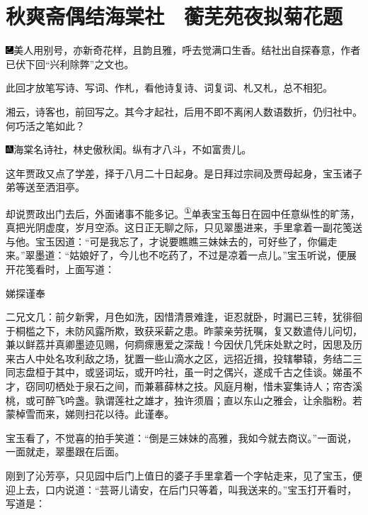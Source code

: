 

\chapter{秋爽斋偶结海棠社　蘅芜苑夜拟菊花题}

{\includegraphics[width=3mm]{../Images/00003}美人用别号，亦新奇花样，且韵且雅，呼去觉满口生香。结社出自探春意，作者已伏下回``兴利除弊''之文也。}

{此回才放笔写诗、写词、作札，看他诗复诗、词复词、札又札，总不相犯。}

{湘云，诗客也，前回写之。其今才起社，后用不即不离闲人数语数折，仍归社中。何巧活之笔如此？}

{\includegraphics[width=3mm]{../Images/00005}海棠名诗社，林史傲秋闺。纵有才八斗，不如富贵儿。}

这年贾政又点了学差，择于八月二十日起身。是日拜过宗祠及贾母起身，宝玉诸子弟等送至洒泪亭。

却说贾政出门去后，外面诸事不能多记。\href{../Text/part0041_split_000.html\#lnkback_1_a}{\textsuperscript{①}}单表宝玉每日在园中任意纵性的旷荡，真把光阴虚度，岁月空添。这日正无聊之际，只见翠墨进来，手里拿着一副花笺送与他。宝玉因道：``可是我忘了，才说要瞧瞧三妹妹去的，可好些了，你偏走来。''翠墨道：``姑娘好了，今儿也不吃药了，不过是凉着一点儿。''宝玉听说，便展开花笺看时，上面写道：

娣探谨奉

二兄文几：前夕新霁，月色如洗，因惜清景难逢，讵忍就卧，时漏已三转，犹徘徊于桐槛之下，未防风露所欺，致获采薪之患。昨蒙亲劳抚嘱，复又数遣侍儿问切，兼以鲜荔并真卿墨迹见赐，何痌瘝惠爱之深哉！今因伏几凭床处默之时，因思及历来古人中处名攻利敌之场，犹置一些山滴水之区，远招近揖，投辖攀辕，务结二三同志盘桓于其中，或竖词坛，或开吟社，虽一时之偶兴，遂成千古之佳谈。娣虽不才，窃同叨栖处于泉石之间，而兼慕薛林之技。风庭月榭，惜未宴集诗人；帘杏溪桃，或可醉飞吟盏。孰谓莲社之雄才，独许须眉；直以东山之雅会，让余脂粉。若蒙棹雪而来，娣则扫花以待。此谨奉。

宝玉看了，不觉喜的拍手笑道：``倒是三妹妹的高雅，我如今就去商议。''一面说，一面就走，翠墨跟在后面。

刚到了沁芳亭，只见园中后门上值日的婆子手里拿着一个字帖走来，见了宝玉，便迎上去，口内说道：``芸哥儿请安，在后门只等着，叫我送来的。''宝玉打开看时，写道是：

